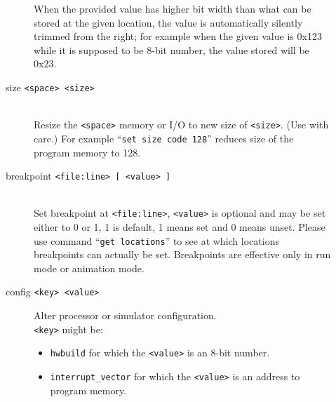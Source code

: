 \begin{description}
\begin{description}
                        When the provided value has higher bit width than what can be stored at the given location, the value is automatically silently trimmed from the right; for example when the given value is 0x123 while it is supposed to be 8-bit number, the value stored will be 0x23.
                    \item[size \texttt{<space> <size>}]~\\
                        Resize the \texttt{<space>} memory or I/O to new size of \texttt{<size>}. (Use with care.) For example ``\texttt{set size code 128}'' reduces size of the program memory to 128.
                    \item[breakpoint \texttt{<file:line> {[} <value> {]}}]~\\
                        Set breakpoint at \texttt{<file:line>}, \texttt{<value>} is optional and may be set either to 0 or 1, 1 is default, 1 means set and 0 means unset. Please use command ``\texttt{get locations}'' to see at which locations breakpoints can actually be set. Breakpoints are effective only in run mode or animation mode.
                    \item[config \texttt{<key> <value>}]
                        Alter processor or simulator configuration.
                        ~\\\texttt{<key>} might be:
                        \begin{itemize}
                            \item \texttt{hwbuild} for which the \texttt{<value>} is an 8-bit number.
                            \item \texttt{interrupt\_vector} for which the \texttt{<value>} is an address to program memory.
                        \end{itemize}
                \end{description}


\end{description}
